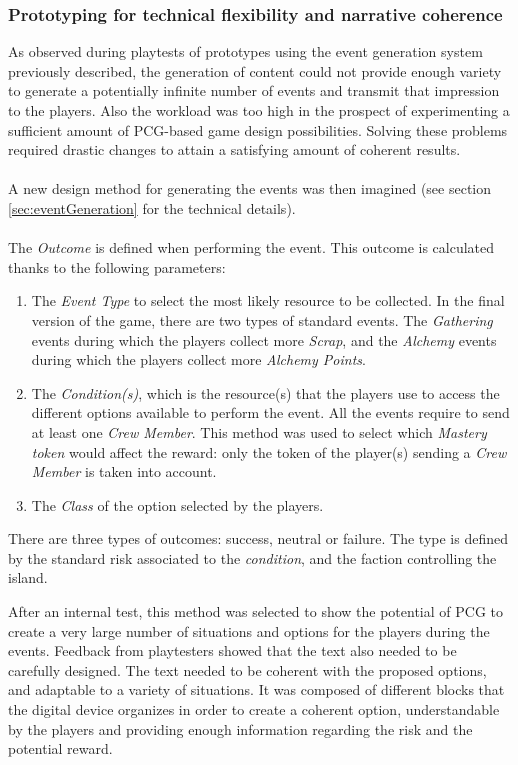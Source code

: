 \subsubsection{Prototyping for technical flexibility and narrative coherence}
As observed during playtests of prototypes using the event generation system previously described, the generation of content could not provide enough variety to generate a potentially infinite number of events and transmit that impression to the players. Also the workload was too high in the prospect of experimenting a sufficient amount of PCG-based game design possibilities. Solving these problems required drastic changes to attain a satisfying amount of coherent results.\\\\
A new design method for generating the events was then imagined (see section \ref{sec:eventGeneration} for the technical details).\\\\
The \textit{Outcome} is defined when performing the event. This outcome is calculated thanks to the following parameters:
\begin{enumerate}
\item The \textit{Event Type} to select the most likely resource to be collected. In the final version of the game, there are two types of standard events. The \textit{Gathering} events during which the players collect more \textit{Scrap}, and the \textit{Alchemy} events during which the players collect more \textit{Alchemy Points}.
\item The \textit{Condition(s)}, which is the resource(s) that the players use to access the different options available to perform the event. All the events require to send at least one \textit{Crew Member}. This method was used to select which \textit{Mastery token} would affect the reward: only the token of the player(s) sending a \textit{Crew Member} is taken into account.
\item The \textit{Class} of the option selected by the players. 
\end{enumerate}
There are three types of outcomes: success, neutral or failure. The type is defined by the standard risk associated to the \textit{condition}, and the faction controlling the island. 

After an internal test, this method was selected to show the potential of PCG to create a very large number of situations and options for the players during the events. Feedback from playtesters showed that the text also needed to be carefully designed. The text needed to be coherent with the proposed options, and adaptable to a variety of situations. It was composed of different blocks that the digital device organizes in order to create a coherent option, understandable by the players and providing enough information regarding the risk and the potential reward.


